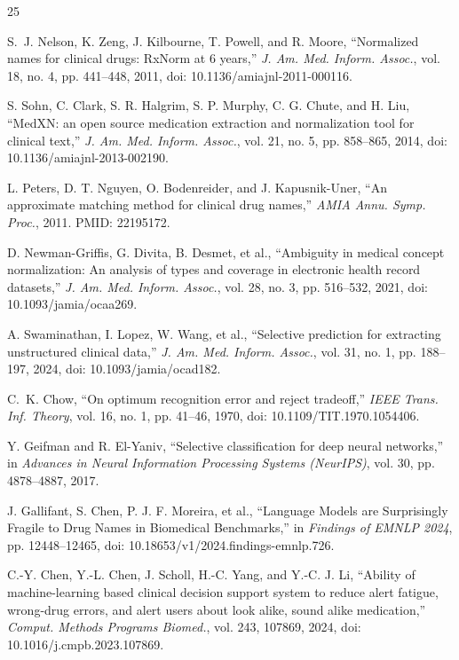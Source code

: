 \documentclass[11pt]{article}
\begin{document}
\sloppy
\begin{thebibliography}{25}

S.~J. Nelson, K. Zeng, J. Kilbourne, T. Powell, and R. Moore,
``Normalized names for clinical drugs: RxNorm at 6 years,''
\emph{J. Am. Med. Inform. Assoc.}, vol. 18, no. 4, pp. 441--448, 2011, doi: 10.1136/amiajnl-2011-000116.

S. Sohn, C. Clark, S. R. Halgrim, S. P. Murphy, C. G. Chute, and H. Liu,
``MedXN: an open source medication extraction and normalization tool for clinical text,''
\emph{J. Am. Med. Inform. Assoc.}, vol. 21, no. 5, pp. 858--865, 2014, doi: 10.1136/amiajnl-2013-002190.

L. Peters, D. T. Nguyen, O. Bodenreider, and J. Kapusnik-Uner,
``An approximate matching method for clinical drug names,''
\emph{AMIA Annu. Symp. Proc.}, 2011. PMID: 22195172.

D. Newman-Griffis, G. Divita, B. Desmet, et al.,
``Ambiguity in medical concept normalization: An analysis of types and coverage in electronic health record datasets,''
\emph{J. Am. Med. Inform. Assoc.}, vol. 28, no. 3, pp. 516--532, 2021, doi: 10.1093/jamia/ocaa269.

A. Swaminathan, I. Lopez, W. Wang, et al.,
``Selective prediction for extracting unstructured clinical data,''
\emph{J. Am. Med. Inform. Assoc.}, vol. 31, no. 1, pp. 188--197, 2024, doi: 10.1093/jamia/ocad182.

C.~K. Chow,
``On optimum recognition error and reject tradeoff,''
\emph{IEEE Trans. Inf. Theory}, vol. 16, no. 1, pp. 41--46, 1970, doi: 10.1109/TIT.1970.1054406.

Y. Geifman and R. El-Yaniv,
``Selective classification for deep neural networks,''
in \emph{Advances in Neural Information Processing Systems (NeurIPS)}, vol. 30, pp. 4878--4887, 2017.

J. Gallifant, S. Chen, P. J. F. Moreira, et al.,
``Language Models are Surprisingly Fragile to Drug Names in Biomedical Benchmarks,''
in \emph{Findings of EMNLP 2024}, pp. 12448--12465, doi: 10.18653/v1/2024.findings-emnlp.726.

C.-Y. Chen, Y.-L. Chen, J. Scholl, H.-C. Yang, and Y.-C. J. Li,
``Ability of machine-learning based clinical decision support system to reduce alert fatigue, wrong-drug errors, and alert users about look alike, sound alike medication,''
\emph{Comput. Methods Programs Biomed.}, vol. 243, 107869, 2024, doi: 10.1016/j.cmpb.2023.107869.


\end{thebibliography}
\end{document}
